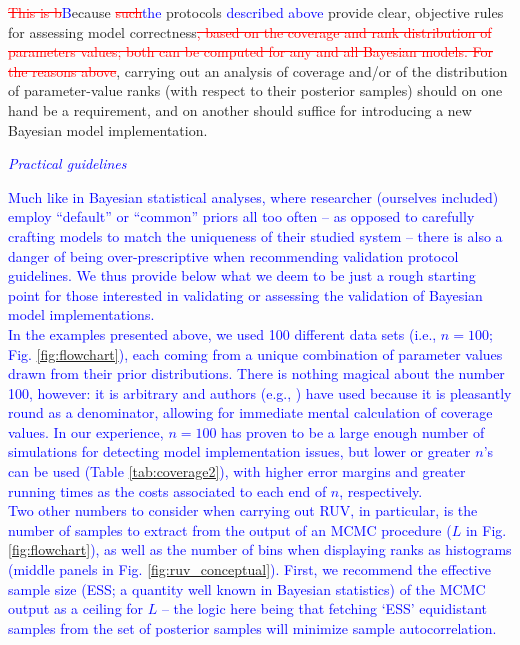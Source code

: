 \documentclass[oneside]{article}
\begin{document}
\textcolor{red}{\st{This is b}}\textcolor{blue}{B}ecause \textcolor{red}{\st{such}}\textcolor{blue}{the} protocols \textcolor{blue}{described above} provide clear, objective rules for assessing model correctness\textcolor{red}{\st{, based on the coverage and rank distribution of parameters values; both can be computed for any and all Bayesian models. For the reasons above}}, carrying out an analysis of coverage and/or of the distribution of parameter-value ranks (with respect to their posterior samples) should on one hand be a requirement, and on another should suffice for introducing a new Bayesian model implementation.

\vspace{.25cm}

\textcolor{blue}{\noindent \emph{Practical guidelines}}

\textcolor{blue}{Much like in Bayesian statistical analyses, where researcher (ourselves included) employ ``default'' or ``common'' priors all too often -- as opposed to carefully crafting models to match the uniqueness of their studied system -- there is also a danger of being over-prescriptive when recommending validation protocol guidelines. 
We thus provide below what we deem to be just a rough starting point for those interested in validating or assessing the validation of Bayesian model implementations.\\
\indent In the examples presented above, we used 100 different data sets (i.e., $n=100$; Fig. \ref{fig:flowchart}), each coming from a unique combination of parameter values drawn from their prior distributions.
There is nothing magical about the number 100, however: it is arbitrary and authors (e.g., \citealp{gavryushkina14,gaboriau20,ogilvie22}) have used because it is pleasantly round as a denominator, allowing for immediate mental calculation of coverage values.
In our experience, $n=100$ has proven to be a large enough number of simulations for detecting model implementation issues, but lower or greater $n$'s can be used (Table \ref{tab:coverage2}), with higher error margins and greater running times as the costs associated to each end of $n$, respectively.\\
\indent Two other numbers to consider when carrying out RUV, in particular, is the number of samples to extract from the output of an MCMC procedure ($L$ in Fig. \ref{fig:flowchart}), as well as the number of bins when displaying ranks as histograms (middle panels in Fig. \ref{fig:ruv_conceptual}).
First, we recommend the effective sample size (ESS; a quantity well known in Bayesian statistics) of the MCMC output as a ceiling for $L$ -- the logic here being that fetching `ESS' equidistant samples from the set of posterior samples will minimize sample autocorrelation.
}
\end{document}
